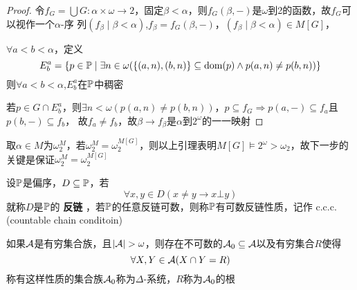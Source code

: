 \documentclass[11pt]{article}
\begin{document}
\begin{proof}
令\(f_G=\bigcup G:\alpha\times\omega\to 2\)，固定\(\beta<\alpha\)，则\(f_G(\beta,-)\)是\(\omega\)到2的函数，故\(f_G\)可以视作一个\(\alpha\)-序
列\((f_\beta\mid\beta<\alpha)\),\(f_\beta=f_G(\beta,-)\)，\((f_\beta\mid\beta<\alpha)\in M[G]\)，

\(\forall a<b<\alpha\)，定义
\begin{equation*}
E_b^a=\{p\in\P\mid\exists n\in\omega(\{(a,n),(b,n)\}\subseteq\dom(p)\wedge p(a,n)\neq p(b,n))\}
\end{equation*}
则\(\forall a<b<\alpha\),\(E_b^a\)在\(\P\)中稠密

若\(p\in G\cap E_b^a\)，则\(\exists n<\omega(p(a,n)\neq p(b,n))\)，\(p\subseteq f_G\Rightarrow p(a,-)\subseteq f_a\)且\(p(b,-)\subseteq f_b\)，
故\(f_a\neq f_b\)，故\(\beta\to f_\beta\)是\(\alpha\)到\(2^\omega\)的一一映射
\end{proof}

\begin{remark}
取\(\alpha\in M\)为\(\omega_2^M\)，若\(\omega_2^M=\omega_2^{M[G]}\)，则以上引理表明\(M[G]\vDash 2^\omega>\omega_2\)，故下一步的关键是保证\(\omega_2^M=\omega_2^{M[G]}\)
\end{remark}

\begin{definition}[]
设\(\P\)是偏序，\(D\subseteq\P\)，若
\begin{equation*}
\forall x,y\in D(x\neq y\to x\bot y)
\end{equation*}
就称\(D\)是\(\P\)的 \textbf{反链} ，若\(\P\)的任意反链可数，则称\(\P\)有可数反链性质，记作 c.c.c.(countable
chain conditoin)
\end{definition}

\begin{lemma}
如果\(\cala\)是有穷集合族，且\(\abs{\cala}>\omega\)，则存在不可数的\(\cala_0\subseteq\cala\)以及有穷集合\(R\)使得
\begin{equation*}
\forall X,Y\in\cala(X\cap Y=R)
\end{equation*}
称有这样性质的集合族\(\cala_0\)称为\(\Delta\)-系统，\(R\)称为\(\cala_0\)的根
\end{lemma}
\end{document}
